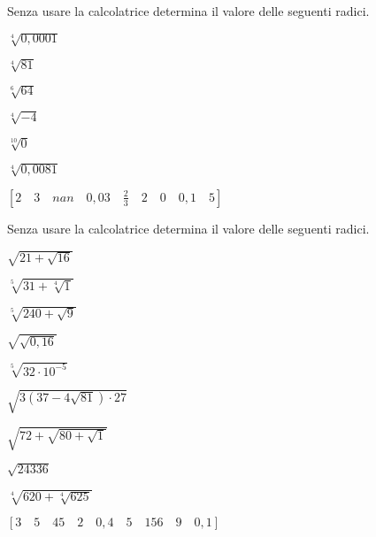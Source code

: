 \begin{esercizio}
 \label{ese:2.08}
Senza usare la calcolatrice determina il valore delle seguenti radici.
\vspace{-.7em}
 \begin{multicols}{3}
 \begin{enumeratea}
 \item $\sqrt[4]{0,0001}$
 \item $\sqrt[4]{81}$
 \item $\sqrt[6]{64}$
 \item $\sqrt[4]{-4}$
 \item $\sqrt[10]0$
 \item $\sqrt[4]{0,0081}$
 \end{enumeratea}
 \end{multicols}
\begin{flushright}
\vspace*{-8pt}
$[2 \quad 3 \quad nan \quad 0,03 \quad \frac{2}{3} \quad 2 \quad 0 
\quad 0,1 \quad 5]$
\end{flushright}
\end{esercizio}
\vspace{-1.0em}

\begin{esercizio}[\Ast]
\label{ese:2.09}
Senza usare la calcolatrice determina il valore delle seguenti radici.
\vspace{-.7em}
 \begin{multicols}{3}
 \begin{enumeratea}
 \item $\sqrt{21+\sqrt{16}}$
 \item $\sqrt[5]{31+\sqrt[4]1}$
 \item $\sqrt[5]{240+\sqrt 9}$
 \item $\sqrt{\sqrt{0,16}}$
 \item $\sqrt[5]{32\cdot 10^{-5}}$
 \item $\sqrt{3 (37-4\sqrt{81})\cdot 27}$
 \item $\sqrt{72+\sqrt{80+\sqrt 1}}$
 \item $\sqrt{24336}$
 \item $\sqrt[4]{620+\sqrt[4]{625}}$
 \end{enumeratea}
 \end{multicols}
\begin{flushright}
\vspace*{-8pt}
$[3 \quad 5 \quad 45 \quad 2 \quad 0,4 \quad 5 \quad 156 \quad 9 \quad 0,1]$
\end{flushright}
\end{esercizio}

